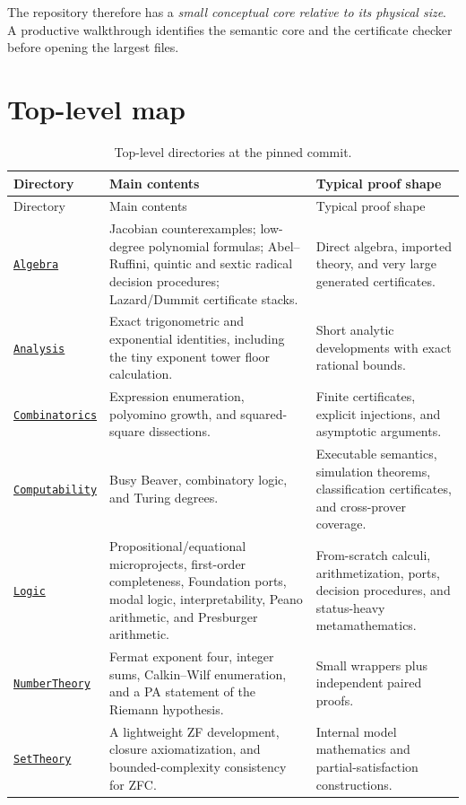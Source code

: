 \documentclass[
  10pt,
  a4paper,
  twoside,
  open=any,
  parskip=half,
  headings=big
]{scrreprt}
\newcommand{\CommitFull}{675d0a2ff0fc624fba199e006049016ba806f40a}
\newcommand{\RepoTreeBase}{https://github.com/VladimirReshetnikov/ProveIt/tree/\CommitFull/}
\newcommand{\RepoDir}[1]{%
  \href{\RepoTreeBase\detokenize{#1}}{\nolinkurl{#1}}}
\begin{document}
The repository therefore has a \emph{small conceptual core relative to its
physical size}.  A productive walkthrough identifies the semantic core and the
certificate checker before opening the largest files.

\section{Top-level map}

\begin{longtable}{L{.18\textwidth}L{.52\textwidth}L{.22\textwidth}}
\caption{Top-level directories at the pinned commit.}
\label{tab:top-level}\\
\toprule
Directory & Main contents & Typical proof shape \\
\midrule
\endfirsthead
\toprule
Directory & Main contents & Typical proof shape \\
\midrule
\endhead
\RepoDir{Algebra} &
Jacobian counterexamples; low-degree polynomial formulas; Abel--Ruffini,
quintic and sextic radical decision procedures; Lazard/Dummit certificate
stacks. &
Direct algebra, imported theory, and very large generated certificates.\\
\RepoDir{Analysis} &
Exact trigonometric and exponential identities, including the tiny exponent
tower floor calculation. &
Short analytic developments with exact rational bounds.\\
\RepoDir{Combinatorics} &
Expression enumeration, polyomino growth, and squared-square dissections. &
Finite certificates, explicit injections, and asymptotic arguments.\\
\RepoDir{Computability} &
Busy Beaver, combinatory logic, and Turing degrees. &
Executable semantics, simulation theorems, classification certificates,
and cross-prover coverage.\\
\RepoDir{Logic} &
Propositional/equational microprojects, first-order completeness,
Foundation ports, modal logic, interpretability, Peano arithmetic, and
Presburger arithmetic. &
From-scratch calculi, arithmetization, ports, decision procedures, and
status-heavy metamathematics.\\
\RepoDir{NumberTheory} &
Fermat exponent four, integer sums, Calkin--Wilf enumeration, and a PA
statement of the Riemann hypothesis. &
Small wrappers plus independent paired proofs.\\
\RepoDir{SetTheory} &
A lightweight ZF development, closure axiomatization, and bounded-complexity
consistency for ZFC. &
Internal model mathematics and partial-satisfaction constructions.\\

\end{longtable}
\end{document}
